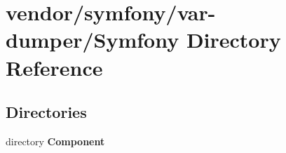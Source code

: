 \section{vendor/symfony/var-\/dumper/\+Symfony Directory Reference}
\label{dir_74cfe47b8b9716be0453f211e409b3c2}
\subsection*{Directories}
\begin{DoxyCompactItemize}
\item 
directory {\bf Component}
\end{DoxyCompactItemize}

